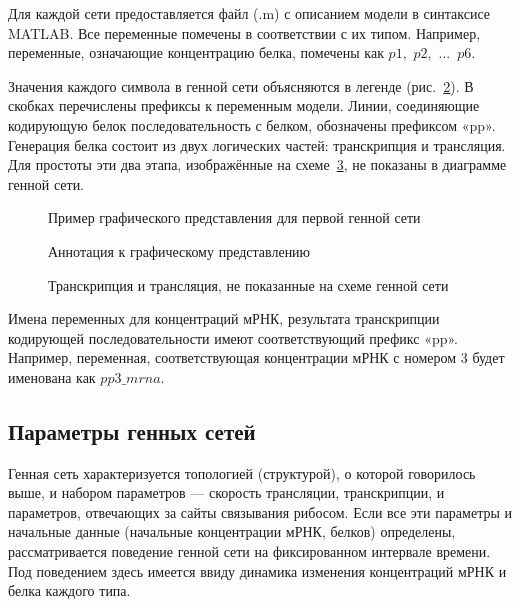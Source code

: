 Для каждой сети предоставляется файл (.m) с описанием модели в 
синтаксисе MATLAB. Все переменные помечены в соответствии с их типом. 
Например, переменные, означающие концентрацию белка, помечены как 
$p1$,~$p2$,~...~$p6$. 

Значения каждого символа в генной сети 
объясняются в легенде (рис.~\ref{img:GrnImageDesc}). В скобках перечислены 
префиксы к переменным модели. Линии, соединяющие кодирующую белок 
последовательность с белком, обозначены префиксом «pp». Генерация белка состоит 
из двух логических частей: транскрипция и трансляция. Для простоты эти два 
этапа, изображённые на схеме~\ref{img:GrnImageTT}, не показаны в диаграмме 
генной сети. 

\begin{figure}[h]
  \caption{Пример графического представления для первой генной сети}
  \label{img:GrnImage}
\end{figure}

\begin{figure}[h]
  \caption{Аннотация к графическому представлению}
  \label{img:GrnImageDesc}
\end{figure}

\begin{figure}[h]
  \caption{Транскрипция и трансляция, не показанные на схеме генной сети}
  \label{img:GrnImageTT}
\end{figure}

Имена переменных для концентраций мРНК, результата транскрипции кодирующей 
последовательности имеют соответствующий префикс «pp». Например, переменная, 
соответствующая концентрации мРНК с номером $3$ будет именована как $pp3\_mrna$.

\subsection{Параметры генных сетей} \label{s2_3}

Генная сеть характеризуется топологией (структурой), о которой говорилось выше, 
и набором параметров — скорость трансляции, транскрипции, и параметров, 
отвечающих за сайты связывания рибосом. Если все эти параметры и начальные 
данные (начальные концентрации мРНК, белков) определены, рассматривается 
поведение генной сети на фиксированном интервале времени. Под поведением здесь 
имеется ввиду динамика изменения концентраций мРНК и белка каждого типа.

